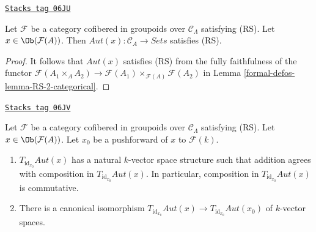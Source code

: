 \begin{lemma}
\label{formal-defos-lemma-Aut-functor-RS}
\href{https://stacks.math.columbia.edu/tag/06JU}{\texttt{Stacks tag 06JU}}

Let $\mathcal{F}$ be a category cofibered in groupoids over
$\mathcal{C}_\Lambda$ satisfying (RS). Let
$x \in \Ob(\mathcal{F}(A))$. Then
$\mathit{Aut}(x): \mathcal{C}_A \to \textit{Sets}$ satisfies (RS).
\end{lemma}

\begin{proof}
It follows that $\mathit{Aut}(x)$ satisfies (RS) from the fully
faithfulness of the functor
$\mathcal{F}(A_1 \times_A A_2) \to
\mathcal{F}(A_1) \times_{\mathcal{F}(A)} \mathcal{F}(A_2)$ in
Lemma \ref{formal-defos-lemma-RS-2-categorical}.
\end{proof}

\begin{lemma}
\label{formal-defos-lemma-Aut-functor-tangent-space}
\href{https://stacks.math.columbia.edu/tag/06JV}{\texttt{Stacks tag 06JV}}

Let $\mathcal{F}$ be a category cofibered in groupoids over
$\mathcal{C}_\Lambda$ satisfying (RS). Let
$x \in \Ob(\mathcal{F}(A))$. Let $x_0$ be a pushforward of $x$ to
$\mathcal{F}(k)$.
\begin{enumerate}
\item $T_{\text{id}_{x_0}} \mathit{Aut}(x)$ has a natural $k$-vector
space structure such that addition agrees with composition in
$T_{\text{id}_{x_0}} \mathit{Aut}(x)$. In particular, composition in
$T_{\text{id}_{x_0}} \mathit{Aut}(x)$ is commutative.
\item There is a canonical isomorphism
$T_{\text{id}_{x_0}} \mathit{Aut}(x) \to
T_{\text{id}_{x_0}} \mathit{Aut}(x_0)$
of $k$-vector spaces.
\end{enumerate}
\end{lemma}

